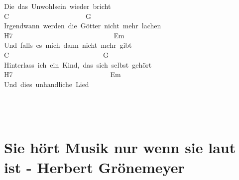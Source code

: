 \documentclass[]{book}
\let\stdsection\section
\renewcommand\section{\clearpage\stdsection}
\begin{document}
Die~das~Unwohlsein~wieder~bricht\\
\hspace*{0.333em}\hspace*{0.333em}\hspace*{0.333em}\hspace*{0.333em}\hspace*{0.333em}\hspace*{0.333em}\hspace*{0.333em}C~~~~~~~~~~~~~~~~~~~~~~G\\
Irgendwann~werden~die~Götter~nicht~mehr~lachen~\\
\hspace*{0.333em}\hspace*{0.333em}\hspace*{0.333em}\hspace*{0.333em}H7~~~~~~~~~~~~~~~~~~~~~~~~~~~~~Em\\
Und~falls~es~mich~dann~nicht~mehr~gibt~\\
\hspace*{0.333em}\hspace*{0.333em}\hspace*{0.333em}\hspace*{0.333em}\hspace*{0.333em}\hspace*{0.333em}\hspace*{0.333em}\hspace*{0.333em}C~~~~~~~~~~~~~~~~~~~~~~~~~~~G\\
Hinterlass~ich~ein~Kind,~das~sich~selbst~gehört\\
H7~~~~~~~~~~~~~~~~~~~~~~~~~~~~Em\\
\hspace*{0.333em}\hspace*{0.333em}\hspace*{0.333em}Und~dies~unhandliche~Lied\\
\hspace*{0.333em}\hspace*{0.333em}\hspace*{0.333em}\\
~\\
~\\

\hypertarget{sie-hort-musik-nur-wenn-sie-laut-ist---herbert-gronemeyer}{%
\section{Sie hört Musik nur wenn sie laut ist - Herbert Grönemeyer}\label{sie-hort-musik-nur-wenn-sie-laut-ist---herbert-gronemeyer}}
\end{document}
